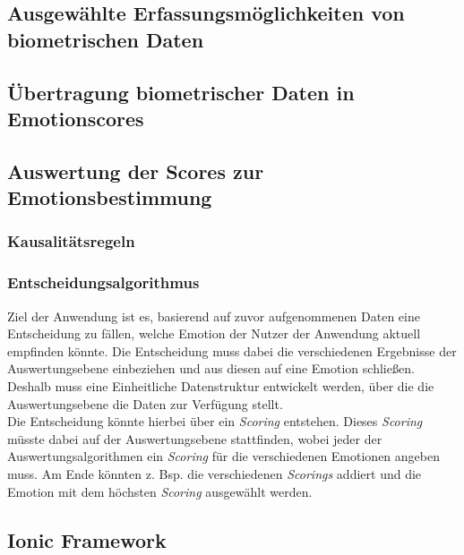 \subsection{Ausgewählte Erfassungsmöglichkeiten von biometrischen Daten}
\subsection{Übertragung biometrischer Daten in Emotionscores}
\subsection{Auswertung der Scores zur Emotionsbestimmung}
\subsubsection{Kausalitätsregeln}
\subsubsection{Entscheidungsalgorithmus}
Ziel der Anwendung ist es, basierend auf zuvor aufgenommenen Daten eine Entscheidung zu fällen, welche Emotion der Nutzer der 
Anwendung aktuell empfinden könnte. Die Entscheidung muss dabei die verschiedenen Ergebnisse der Auswertungsebene einbeziehen
und aus diesen auf eine Emotion schließen. Deshalb muss eine Einheitliche Datenstruktur entwickelt werden, über die die Auswertungsebene
die Daten zur Verfügung stellt. \\
Die Entscheidung könnte hierbei über ein \textit{Scoring} entstehen. Dieses \textit{Scoring} müsste dabei auf der Auswertungsebene stattfinden, 
wobei jeder der Auswertungsalgorithmen ein \textit{Scoring} für die verschiedenen Emotionen angeben muss. Am Ende könnten z. Bsp. die verschiedenen 
\textit{Scorings} addiert und die Emotion mit dem höchsten \textit{Scoring} ausgewählt werden.
\subsection{Ionic Framework}
